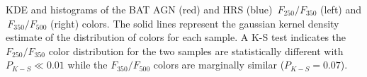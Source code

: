\label{fig:hist_250_350_color} KDE and histograms of the BAT AGN (red) and HRS (blue) $\,F_{250}/F_{350}$ (left) and  $\,F_{350}/F_{500}$ (right) colors. The solid lines represent the gaussian kernel density estimate of the distribution of colors for each sample. A K-S test indicates the $F_{250}/F_{350}$ color distribution for the two samples are statistically different with $P_{K-S} \ll 0.01$ while the $F_{350}/F_{500}$ colors are marginally similar ($P_{K-S} = 0.07$).